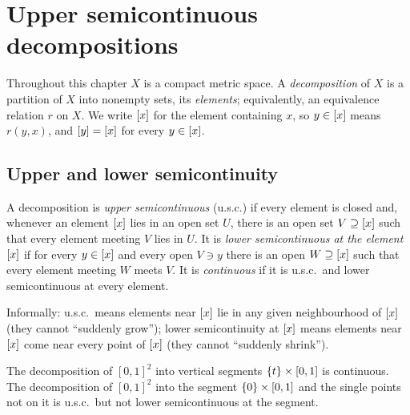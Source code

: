 \chapter{Upper semicontinuous decompositions}\label{ch:decomp}

Throughout this chapter $X$ is a compact metric space. A \emph{decomposition} of $X$ is a partition
of $X$ into nonempty sets, its \emph{elements}; equivalently, an equivalence relation $r$ on $X$. We
write $[x]$ for the element containing $x$, so $y\in[x]$ means $r(y,x)$, and $[y]=[x]$ for
every $y\in[x]$.

\section{Upper and lower semicontinuity}

\begin{definition}\label{def:usc}
A decomposition is \emph{upper semicontinuous} (u.s.c.) if every element is closed and, whenever
an element $[x]$ lies in an open set $U$, there is an open set $V\supseteq[x]$ such that every
element meeting $V$ lies in $U$. It is \emph{lower semicontinuous at the element $[x]$} if for
every $y\in[x]$ and every open $V\ni y$ there is an open $W\supseteq[x]$ such that every element
meeting $W$ meets $V$. It is \emph{continuous} if it is u.s.c.\ and lower semicontinuous at every
element.
\end{definition}


Informally: u.s.c.\ means elements near $[x]$ lie in any given neighbourhood of $[x]$ (they
cannot ``suddenly grow''); lower semicontinuity at $[x]$ means elements near $[x]$ come near
every point of $[x]$ (they cannot ``suddenly shrink'').

\begin{example}
The decomposition of $[0,1]^2$ into vertical segments $\left\{ t \right\}\times[0,1]$ is continuous. The
decomposition of $[0,1]^2$ into the segment $\left\{ 0 \right\}\times[0,1]$ and the single points not on it is
u.s.c.\ but not lower semicontinuous at the segment.
\end{example}

